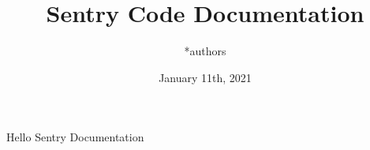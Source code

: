 \documentclass{article}
\title{Sentry Code Documentation}
\author{*authors}
\date{January 11th, 2021}
\begin{document}
\maketitle
Hello Sentry Documentation
\end{document}
